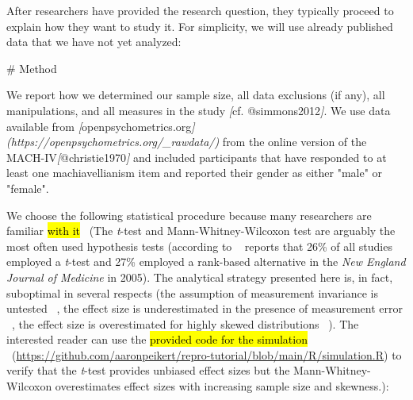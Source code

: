 \documentclass[psych,tutorial,accept,moreauthors,pdftex]{Definitions/mdpi}
\newenvironment{Shaded}{\begin{snugshade}}{\end{snugshade}}
\newcommand{\CommentTok}[1]{\textcolor[rgb]{0.56,0.35,0.01}{\textit{#1}}}
\newcommand{\FunctionTok}[1]{\textcolor[rgb]{0.00,0.00,0.00}{#1}}
\newcommand{\NormalTok}[1]{#1}
\newcommand{\OtherTok}[1]{\textcolor[rgb]{0.56,0.35,0.01}{#1}}
\begin{document}
\begin{paracol}{2}
\switchcolumn


After researchers have provided the research question, they typically
proceed to explain how they want to study it. For simplicity, we will
use already published data that we have not yet analyzed:

\vspace{+6pt}
\end{paracol}
\nointerlineskip
\begin{adjustwidth}{0.5cm}{0cm} 
\begin{Shaded}
\begin{Highlighting}[]
\FunctionTok{\# Method}

\NormalTok{We report how we determined our sample size, all data exclusions (if any), all}
\NormalTok{manipulations, and all measures in the study }\CommentTok{[}\OtherTok{cf. @simmons2012}\CommentTok{]}\NormalTok{. We use data}
\NormalTok{available from }\CommentTok{[}\OtherTok{openpsychometrics.org}\CommentTok{](https://openpsychometrics.org/\_rawdata/)}
\NormalTok{from the online version of the MACH{-}IV}\CommentTok{[}\OtherTok{@christie1970}\CommentTok{]}\NormalTok{ and included participants}
\NormalTok{that have responded to at least one machiavellianism item and reported their}
\NormalTok{gender as either "male" or "female".}
\end{Highlighting}
\end{Shaded}
\end{adjustwidth}
\begin{paracol}{2}
\switchcolumn


We choose the following statistical procedure because many researchers
are familiar \hl{with it} %
~(The \emph{t}-test and Mann-Whitney-Wilcoxon test
  are arguably the most often used hypothesis tests (according to
 ~\citep{fagerlandTtestsNonparametricTests2012, hortonStatisticalMethodsJournal2005}
  reports that 26\% of all studies employed a \emph{t}-test and 27\% employed a
  rank-based alternative in the \emph{New England Journal of Medicine}
  in 2005). The analytical strategy presented here is, in fact,
  suboptimal in several respects (the assumption of measurement
  invariance is untested
 ~\citep{putnickMeasurementInvarianceConventions2016}, the effect size
  is underestimated in the presence of measurement error
 ~\citep{frostCorrectingRegressionDilution2000}, the effect size is
  overestimated for highly skewed distributions
 ~\citep{stonehouseRobustnessTestsCombined1998}). The interested reader
  can use the \hl{provided code for the simulation}
~\mbox{(\url{https://github.com/aaronpeikert/repro-tutorial/blob/main/R/simulation.R})} to verify that the \emph{t}-test provides unbiased
  effect sizes but the Mann-Whitney-Wilcoxon overestimates effect sizes
  with increasing sample size and skewness.):

\vspace{+6pt}
\end{paracol}
\end{document}
